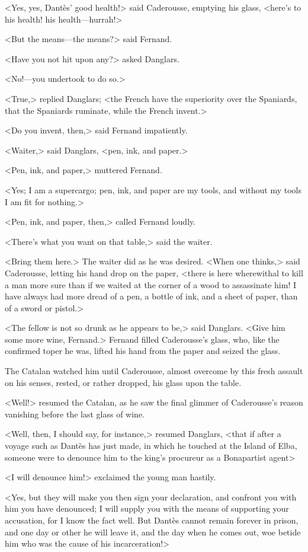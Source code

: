  <Yes, yes, Dantès' good health!> said Caderousse, emptying his glass, <here's to his health! his health—hurrah!> 

 <But the means—the means?> said Fernand. 

 <Have you not hit upon any?> asked Danglars. 

 <No!—you undertook to do so.> 

 <True,> replied Danglars; <the French have the superiority over the Spaniards, that the Spaniards ruminate, while the French invent.> 

 <Do you invent, then,> said Fernand impatiently. 

 <Waiter,> said Danglars, <pen, ink, and paper.> 

 <Pen, ink, and paper,> muttered Fernand. 

 <Yes; I am a supercargo; pen, ink, and paper are my tools, and without my tools I am fit for nothing.> 

 <Pen, ink, and paper, then,> called Fernand loudly. 

 <There's what you want on that table,> said the waiter. 

 <Bring them here.> The waiter did as he was desired.  <When one thinks,> said Caderousse, letting his hand drop on the paper, <there is here wherewithal to kill a man more sure than if we waited at the corner of a wood to assassinate him! I have always had more dread of a pen, a bottle of ink, and a sheet of paper, than of a sword or pistol.> 

 <The fellow is not so drunk as he appears to be,> said Danglars. <Give him some more wine, Fernand.> Fernand filled Caderousse's glass, who, like the confirmed toper he was, lifted his hand from the paper and seized the glass. 

 The Catalan watched him until Caderousse, almost overcome by this fresh assault on his senses, rested, or rather dropped, his glass upon the table. 

 <Well!> resumed the Catalan, as he saw the final glimmer of Caderousse's reason vanishing before the last glass of wine. 

 <Well, then, I should say, for instance,> resumed Danglars, <that if after a voyage such as Dantès has just made, in which he touched at the Island of Elba, someone were to denounce him to the king's procureur as a Bonapartist agent\longdash> 

 <I will denounce him!> exclaimed the young man hastily. 

 <Yes, but they will make you then sign your declaration, and confront you with him you have denounced; I will supply you with the means of supporting your accusation, for I know the fact well. But Dantès cannot remain forever in prison, and one day or other he will leave it, and the day when he comes out, woe betide him who was the cause of his incarceration!> 

